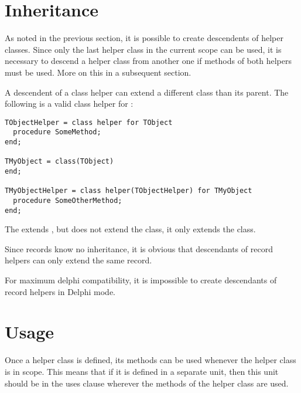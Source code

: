 \section{Inheritance}
As noted in the previous section, it is possible to create descendents of
helper classes. Since only the last helper class in the current scope can 
be used, it is necessary to descend a helper class from another one if
methods of both helpers must be used. More on this in a subsequent section.

A descendent of a class helper can extend a different class than its
parent. The following is a valid class helper for :
\begin{verbatim}
TObjectHelper = class helper for TObject
  procedure SomeMethod;
end;
 
TMyObject = class(TObject)
end;
 
TMyObjectHelper = class helper(TObjectHelper) for TMyObject
  procedure SomeOtherMethod;
end;
\end{verbatim}
The  extends , but does not extend
the  class, it only extends the  class.

Since records know no inheritance, it is obvious that descendants of record
helpers can only extend the same record.

\begin{remark}
For maximum delphi compatibility, it is impossible to create descendants of record helpers
in Delphi mode.
\end{remark}

\section{Usage}
Once a helper class is defined, its methods can be used whenever the helper
class is in scope. This means that if it is defined in a separate unit, then
this unit should be in the uses clause wherever the methods of the helper
class are used. 

